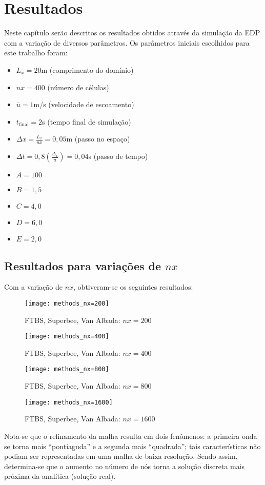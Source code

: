 \chapter{Resultados}
Neste capítulo serão descritos os resultados obtidos através da simulação da
EDP com a variação de diversos parâmetros. Os parâmetros iniciais escolhidos
para este trabalho foram:
\begin{itemize}
    \item $L_x = 20$m (comprimento do domínio)
    \item $nx = 400$ (número de células)
    \item $\bar{u} = 1$m/s (velocidade de escoamento)
    \item $t_\text{final} = 2$s  (tempo final de simulação)
    \item $\Delta x = \frac{L_x}{nx} = 0,05$m (passo no espaço)
    \item $\Delta t = 0,8\left( \frac{\Delta_x}{\bar{u}} \right) = 0,04$s
          (passo de tempo)
    \item $A = 100$
    \item $B = 1,5$
    \item $C = 4,0$
    \item $D = 6,0$
    \item $E = 2,0$
\end{itemize}

\section{Resultados para variações de $nx$}
Com a variação de $nx$, obtiveram-se os seguintes resultados:
\begin{figure}[H]
    \centering
    \texttt{[image: methods\_nx=200]}
    \caption{FTBS, Superbee, Van Albada: $nx = 200$}
\end{figure}
\begin{figure}[H]
    \centering
    \texttt{[image: methods\_nx=400]}
    \caption{FTBS, Superbee, Van Albada: $nx = 400$}
\end{figure}
\begin{figure}[H]
    \centering
    \texttt{[image: methods\_nx=800]}
    \caption{FTBS, Superbee, Van Albada: $nx = 800$}
\end{figure}
\begin{figure}[H]
    \centering
    \texttt{[image: methods\_nx=1600]}
    \caption{FTBS, Superbee, Van Albada: $nx = 1600$}
\end{figure}
Nota-se que o refinamento da malha resulta em dois fenômenos: a primeira onda
se torna mais ``pontiaguda'' e a segunda mais ``quadrada''; tais
características não podiam ser representadas em uma malha de baixa resolução.
Sendo assim, determina-se que o aumento no número de nós torna a solução
discreta mais próxima da analítica (solução real).

